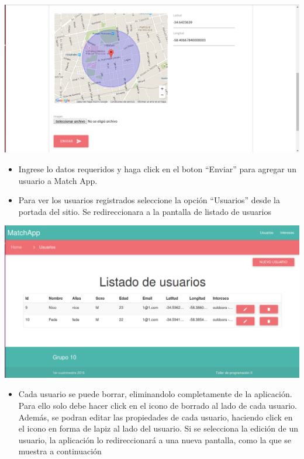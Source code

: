 \documentclass[letterpaper,10pt,english]{sphinxmanual}
\begin{document}
\includegraphics{shared_localizacion2.png}
\begin{itemize}
\item {} 
Ingrese lo datos requeridos y haga click en el boton “Enviar” para agregar un usuario a Match App.

\item {} 
Para ver los usuarios registrados seleccione la opción ``Usuarios'' desde la portada del sitio. Se redireccionara a la pantalla de listado de usuarios

\end{itemize}

\includegraphics{shared_listadoUsuarios.png}
\begin{itemize}
\item {} 
Cada usuario se puede borrar, eliminandolo completamente de la aplicación. Para ello solo debe hacer click en el icono de borrado al lado de cada usuario. Además, se podran editar las propiedades de cada usuario, haciendo click en el icono en forma de lapiz al lado del usuario. Si se selecciona la edición de un usuario, la aplicación lo redireccionará a una nueva pantalla, como la que se muestra a continuación

\end{itemize}
\end{document}
